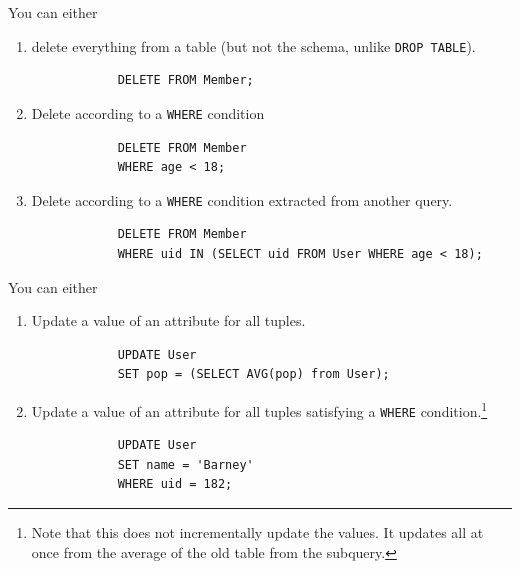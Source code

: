     \begin{definition}
      You can either 
      \begin{enumerate}
        \item delete everything from a table (but not the schema, unlike \texttt{DROP TABLE}). 
          \begin{lstlisting}
            DELETE FROM Member; 
          \end{lstlisting}

        \item Delete according to a \texttt{WHERE} condition 
          \begin{lstlisting}
            DELETE FROM Member 
            WHERE age < 18; 
          \end{lstlisting}

        \item Delete according to a \texttt{WHERE} condition extracted from another query. 
          \begin{lstlisting}
            DELETE FROM Member 
            WHERE uid IN (SELECT uid FROM User WHERE age < 18); 
          \end{lstlisting}
          
      \end{enumerate}
    \end{definition}

    \begin{definition}
      You can either 
      \begin{enumerate}
        \item Update a value of an attribute for all tuples. 
          \begin{lstlisting}
            UPDATE User 
            SET pop = (SELECT AVG(pop) from User); 
          \end{lstlisting}

        \item Update a value of an attribute for all tuples satisfying a \texttt{WHERE} condition.\footnote{Note that this does not incrementally update the values. It updates all at once from the average of the old table from the subquery.}
          \begin{lstlisting}
            UPDATE User 
            SET name = 'Barney' 
            WHERE uid = 182; 
          \end{lstlisting}
      \end{enumerate}
    \end{definition}

